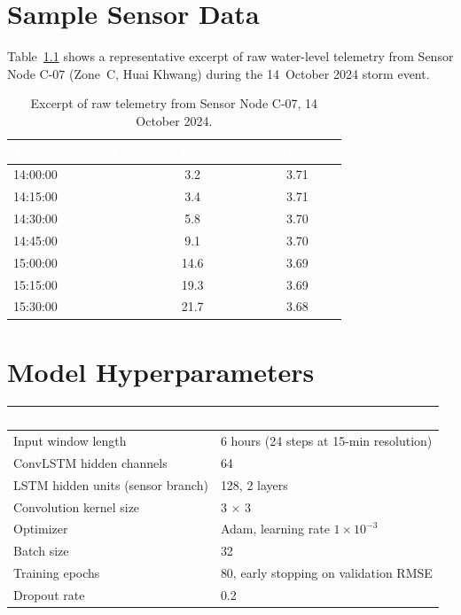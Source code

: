\documentclass[12pt,a4paper]{report}
\begin{document}
\chapter{Sample Sensor Data}

Table~\ref{tab:appendixdata} shows a representative excerpt of raw water-level telemetry from Sensor Node C-07 (Zone~C, Huai Khwang) during the 14~October 2024 storm event.

\begin{table}[htbp]
\centering
\caption{Excerpt of raw telemetry from Sensor Node C-07, 14 October 2024.}
\label{tab:appendixdata}
\renewcommand{\arraystretch}{1.3}
\begin{tabular}{@{}l c c@{}}
\toprule
\rowcolor{chulapink}
\textcolor{white}{\textbf{Timestamp (ICT)}} & \textcolor{white}{\textbf{Water Level (cm)}} & \textcolor{white}{\textbf{Battery (V)}} \\
\midrule
14:00:00 & 3.2 & 3.71 \\
14:15:00 & 3.4 & 3.71 \\
14:30:00 & 5.8 & 3.70 \\
14:45:00 & 9.1 & 3.70 \\
15:00:00 & 14.6 & 3.69 \\
15:15:00 & 19.3 & 3.69 \\
15:30:00 & 21.7 & 3.68 \\
\bottomrule
\end{tabular}
\end{table}

\chapter{Model Hyperparameters}

\begin{center}
\renewcommand{\arraystretch}{1.3}
\begin{tabularx}{\textwidth}{@{}l X@{}}
\toprule
\rowcolor{chulapink}
\textcolor{white}{\textbf{Hyperparameter}} & \textcolor{white}{\textbf{Value}} \\
\midrule
Input window length & 6 hours (24 steps at 15-min resolution) \\
ConvLSTM hidden channels & 64 \\
LSTM hidden units (sensor branch) & 128, 2 layers \\
Convolution kernel size & 3 $\times$ 3 \\
Optimizer & Adam, learning rate $1\times10^{-3}$ \\
Batch size & 32 \\
Training epochs & 80, early stopping on validation RMSE \\
Dropout rate & 0.2 \\
\bottomrule
\end{tabularx}
\end{center}
\end{document}
